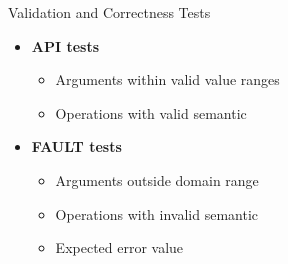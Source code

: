 		\begin{frame}[fragile]{Validation and Correctness Tests}
			\begin{itemize}
				\item \textbf{API tests}
				\begin{itemize}
					\item Arguments within valid value ranges
					\item Operations with valid semantic
				\end{itemize}
				\item \textbf{FAULT tests}
				\begin{itemize}
					\item Arguments outside domain range
					\item Operations with invalid semantic
					\item Expected error value
				\end{itemize}
			\end{itemize}

		\end{frame}

